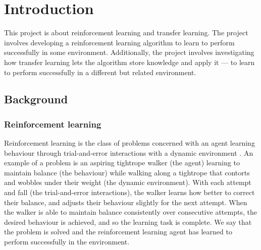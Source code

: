 \documentclass[12pt,a4paper]{article}
\begin{document}
\newpage
\section{Introduction}
This project is about reinforcement learning and transfer learning. The project involves developing a reinforcement learning algorithm to learn to perform successfully in some environment. Additionally, the project involves investigating how transfer learning lets the algorithm store knowledge and apply it --- to learn to perform successfully in a different but related environment.  

\subsection{Background} 
\subsubsection{Reinforcement learning}
Reinforcement learning is the class of problems concerned with an agent learning behaviour through trial-and-error interactions with a dynamic environment \cite{Kaelbling1996}. An example of a problem is an aspiring tightrope walker (the agent) learning to maintain balance (the behaviour) while walking along a tightrope that contorts and wobbles under their weight (the dynamic environment). With each attempt and fall (the trial-and-error interactions), the walker learns how better to correct their balance, and adjusts their behaviour slightly for the next attempt. When the walker is able to maintain balance consistently over consecutive attempts, the desired behaviour is achieved, and so the learning task is complete. We say that the problem is solved and the reinforcement learning agent has learned to perform successfully in the environment.  
\end{document}
